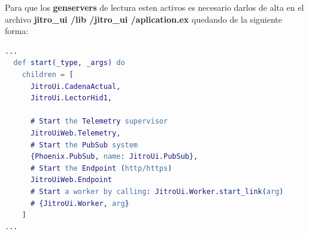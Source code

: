 Para que los \textbf{genservers} de lectura esten activos es necesario darlos de alta en el archivo \textbf{jitro\_ui /lib /jitro\_ui /aplication.ex} quedando de la siguiente forma:

\begin{lstlisting}[language=erlang]
...
  def start(_type, _args) do
    children = [
      JitroUi.CadenaActual,
      JitroUi.LectorHid1,

      # Start the Telemetry supervisor
      JitroUiWeb.Telemetry,
      # Start the PubSub system
      {Phoenix.PubSub, name: JitroUi.PubSub},
      # Start the Endpoint (http/https)
      JitroUiWeb.Endpoint
      # Start a worker by calling: JitroUi.Worker.start_link(arg)
      # {JitroUi.Worker, arg}
    ]
...
\end{lstlisting}

